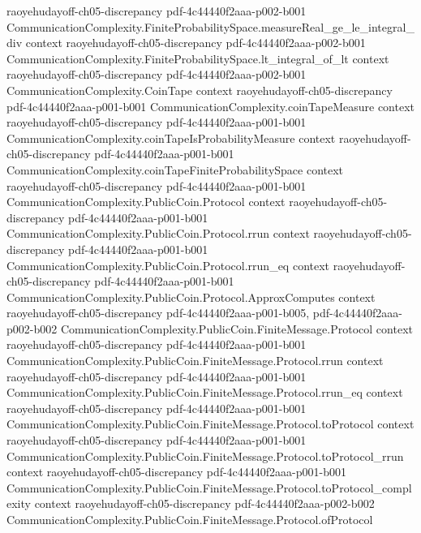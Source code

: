 \begin{theorem}
  {raoyehudayoff-ch05-discrepancy}
  {pdf-4c44440f2aaa-p002-b001}
\proofstep
  {CommunicationComplexity.FiniteProbabilitySpace.measureReal_ge_le_integral_div}
  {context}
  {raoyehudayoff-ch05-discrepancy}
  {pdf-4c44440f2aaa-p002-b001}
\proofstep
  {CommunicationComplexity.FiniteProbabilitySpace.lt_integral_of_lt}
  {context}
  {raoyehudayoff-ch05-discrepancy}
  {pdf-4c44440f2aaa-p002-b001}
\proofstep
  {CommunicationComplexity.CoinTape}
  {context}
  {raoyehudayoff-ch05-discrepancy}
  {pdf-4c44440f2aaa-p001-b001}
\proofstep
  {CommunicationComplexity.coinTapeMeasure}
  {context}
  {raoyehudayoff-ch05-discrepancy}
  {pdf-4c44440f2aaa-p001-b001}
\proofstep
  {CommunicationComplexity.coinTapeIsProbabilityMeasure}
  {context}
  {raoyehudayoff-ch05-discrepancy}
  {pdf-4c44440f2aaa-p001-b001}
\proofstep
  {CommunicationComplexity.coinTapeFiniteProbabilitySpace}
  {context}
  {raoyehudayoff-ch05-discrepancy}
  {pdf-4c44440f2aaa-p001-b001}
\proofstep
  {CommunicationComplexity.PublicCoin.Protocol}
  {context}
  {raoyehudayoff-ch05-discrepancy}
  {pdf-4c44440f2aaa-p001-b001}
\proofstep
  {CommunicationComplexity.PublicCoin.Protocol.rrun}
  {context}
  {raoyehudayoff-ch05-discrepancy}
  {pdf-4c44440f2aaa-p001-b001}
\proofstep
  {CommunicationComplexity.PublicCoin.Protocol.rrun_eq}
  {context}
  {raoyehudayoff-ch05-discrepancy}
  {pdf-4c44440f2aaa-p001-b001}
\proofstep
  {CommunicationComplexity.PublicCoin.Protocol.ApproxComputes}
  {context}
  {raoyehudayoff-ch05-discrepancy}
  {pdf-4c44440f2aaa-p001-b005,
    pdf-4c44440f2aaa-p002-b002}
\proofstep
  {CommunicationComplexity.PublicCoin.FiniteMessage.Protocol}
  {context}
  {raoyehudayoff-ch05-discrepancy}
  {pdf-4c44440f2aaa-p001-b001}
\proofstep
  {CommunicationComplexity.PublicCoin.FiniteMessage.Protocol.rrun}
  {context}
  {raoyehudayoff-ch05-discrepancy}
  {pdf-4c44440f2aaa-p001-b001}
\proofstep
  {CommunicationComplexity.PublicCoin.FiniteMessage.Protocol.rrun_eq}
  {context}
  {raoyehudayoff-ch05-discrepancy}
  {pdf-4c44440f2aaa-p001-b001}
\proofstep
  {CommunicationComplexity.PublicCoin.FiniteMessage.Protocol.toProtocol}
  {context}
  {raoyehudayoff-ch05-discrepancy}
  {pdf-4c44440f2aaa-p001-b001}
\proofstep
  {CommunicationComplexity.PublicCoin.FiniteMessage.Protocol.toProtocol_rrun}
  {context}
  {raoyehudayoff-ch05-discrepancy}
  {pdf-4c44440f2aaa-p001-b001}
\proofstep
  {CommunicationComplexity.PublicCoin.FiniteMessage.Protocol.toProtocol_complexity}
  {context}
  {raoyehudayoff-ch05-discrepancy}
  {pdf-4c44440f2aaa-p002-b002}
\proofstep
  {CommunicationComplexity.PublicCoin.FiniteMessage.Protocol.ofProtocol}

\end{theorem}
